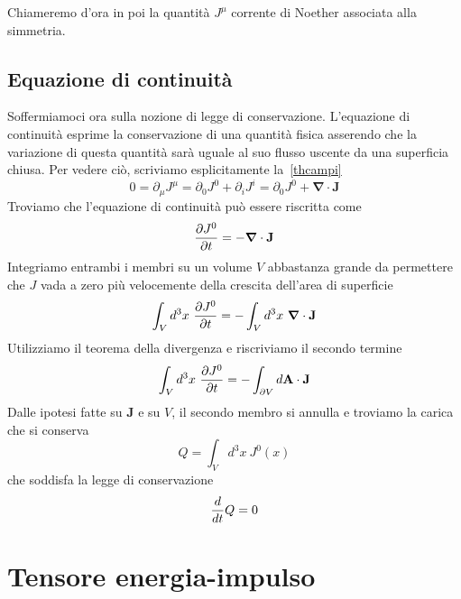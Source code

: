     Chiameremo d'ora in poi la quantità $J^\mu$ corrente di Noether associata alla simmetria. 

\subsection{Equazione di continuità}
    Soffermiamoci ora sulla nozione di legge di conservazione. L'equazione di continuità esprime la conservazione di una quantità fisica asserendo che la variazione di questa quantità sarà uguale al suo flusso uscente da una superficia chiusa. Per vedere ciò, scriviamo esplicitamente la~\eqref{thcampi}
    \begin{equation}
        0 = \partial_\mu J^\mu = \partial_0 J^0 + \partial_i J^i = \partial_0 J^0 + \boldsymbol \nabla \cdot \mathbf J
    \end{equation}
    Troviamo che l'equazione di continuità può essere riscritta come 
    \begin{equation*}
        \frac{\partial J^0}{\partial t} = - \boldsymbol \nabla \cdot \mathbf J
    \end{equation*}
    Integriamo entrambi i membri su un volume $V$ abbastanza grande da permettere che $J$ vada a zero più velocemente della crescita dell'area di superficie
    \begin{equation*}
        \int_V d^3 x ~ \frac{\partial J^0}{\partial t} = - \int_V d^3 x ~ \boldsymbol  \nabla \cdot \mathbf J
    \end{equation*} 
    Utilizziamo il teorema della divergenza e riscriviamo il secondo termine 
    \begin{equation*}
        \int_V d^3 x ~\frac{\partial J^0}{\partial t} = - \int_{\partial V} d \mathbf A \cdot \mathbf J
    \end{equation*} 
    Dalle ipotesi fatte su $\mathbf J$ e su $V$, il secondo membro si annulla e troviamo la carica che si conserva 
    \begin{equation*}
        Q = \int_V d^3 x ~ J^0(x)
    \end{equation*} 
    che soddisfa la legge di conservazione
    \begin{equation*}
        \frac{d}{dt} Q = 0 
    \end{equation*}

\section{Tensore energia-impulso}

